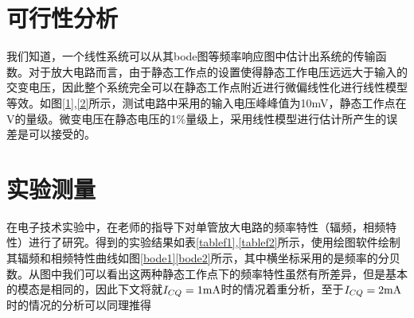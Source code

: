 \documentclass[UTF8,a4paper]{ctexart}
\begin{document}
\section{可行性分析}
我们知道，一个线性系统可以从其bode图等频率响应图中估计出系统的传输函数。对于放大电路而言，由于静态工作点的设置使得静态工作电压远远大于输入的交变电压，因此整个系统完全可以在静态工作点附近进行微偏线性化进行线性模型等效。如图\ref{1},\ref{2}所示，测试电路中采用的输入电压峰峰值为10mV，静态工作点在V的量级。微变电压在静态电压的1\%量级上，采用线性模型进行估计所产生的误差是可以接受的。

\section{实验测量}
在电子技术实验中，在老师的指导下对单管放大电路的频率特性（辐频，相频特性）进行了研究。得到的实验结果如表\ref{tablef1},\ref{tablef2}所示，使用绘图软件绘制其辐频和相频特性曲线如图\ref{bode1}\ref{bode2}所示，其中横坐标采用的是频率的分贝数。从图中我们可以看出这两种静态工作点下的频率特性虽然有所差异，但是基本的模态是相同的，因此下文将就$I_{CQ}=1\rm{mA}$时的情况着重分析，至于$I_{CQ}=2\rm{mA}$时的情况的分析可以同理推得
\end{document}
